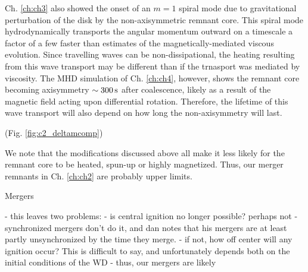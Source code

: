 Ch. \ref{ch:ch3} also showed the onset of an $m = 1$ spiral mode due to gravitational perturbation of the disk by the non-axisymmetric remnant core.  This spiral mode hydrodynamically transports the angular momentum outward on a timescale a factor of a few faster than estimates of the magnetically-mediated viscous evolution. Since travelling waves can be non-dissipational, the heating resulting from this wave transport may be different than if the trnasport was mediated by viscosity.  The MHD simulation of Ch. \ref{ch:ch4}, however, shows the remnant core becoming axisymmetry $\sim300\,\mathrm{s}$ after coalescence, likely as a result of the magnetic field acting upon differential rotation.  Therefore, the lifetime of this wave transport will also depend on how long the non-axisymmetry will last.

(Fig. \ref{fig:c2_deltamcomp})

We note that the modifications discussed above all make it less likely for the remnant core to be heated, spun-up or highly magnetized.  Thus, our merger remnants in Ch. \ref{ch:ch2} are probably upper limits.

Mergers



- this leaves two problems:
	- is central ignition no longer possible?  perhaps not - synchronized mergers don't do it, and dan notes that his mergers are at least partly unsynchronized by the time they merge.
	- if not, how off center will any ignition occur?  This is difficult to say, and unfortunately depends both on the initial conditions of the WD 
	- thus, our mergers are likely 


